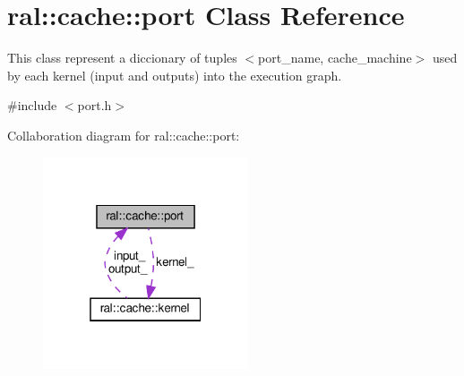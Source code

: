 \hypertarget{classral_1_1cache_1_1port}{}\section{ral\+:\+:cache\+:\+:port Class Reference}
\label{classral_1_1cache_1_1port}


This class represent a diccionary of tuples $<$port\+\_\+name, cache\+\_\+machine$>$ used by each kernel (input and outputs) into the execution graph.  




{\ttfamily \#include $<$port.\+h$>$}



Collaboration diagram for ral\+:\+:cache\+:\+:port\+:\nopagebreak
\begin{figure}[H]
\begin{center}
\leavevmode
\includegraphics[width=172pt]{classral_1_1cache_1_1port__coll__graph}
\end{center}
\end{figure}
